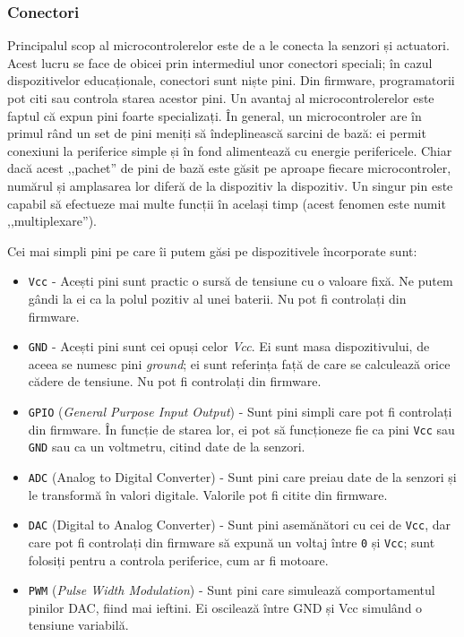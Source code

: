 \subsubsection{Conectori}
\label{sec:embed:micro-comp:micro:connect}

Principalul scop al microcontrolerelor este de a le conecta la senzori și
actuatori. Acest lucru se face de obicei prin intermediul unor conectori
speciali; în cazul dispozitivelor educaționale, conectori sunt niște pini. Din
firmware, programatorii pot citi sau controla starea acestor pini. Un avantaj al
microcontrolerelor este faptul că expun pini foarte specializați. În
general, un microcontroler are în primul rând un set de pini meniți să
îndeplinească sarcini de bază: ei permit conexiuni la periferice simple și în
fond alimentează cu energie perifericele. Chiar dacă acest ,,pachet'' de pini de
bază este găsit pe aproape fiecare microcontroler, numărul și amplasarea lor
diferă de la dispozitiv la dispozitiv. Un singur pin este capabil să efectueze
mai multe funcții în același timp (acest fenomen este numit ,,multiplexare'').

Cei mai simpli pini pe care îi putem găsi pe dispozitivele încorporate sunt:

\begin{itemize}
  \item \texttt{Vcc} - Acești pini sunt practic o sursă de tensiune cu o valoare
		fixă. Ne putem gândi la ei ca la polul pozitiv al unei baterii.
		Nu pot fi controlați din firmware.
              \item \texttt{GND} - Acești pini sunt cei opuși celor \textit{Vcc}. Ei sunt masa
                dispozitivului, de aceea se numesc pini \textit{ground}; ei sunt
		referința față de care se calculează orice cădere de tensiune.
		Nu pot fi controlați din firmware.
              \item \texttt{GPIO}  (\textit{General Purpose
                Input Output}) - Sunt pini simpli care pot fi controlați din
		firmware. În funcție de starea lor, ei pot să funcționeze fie ca
                pini \texttt{Vcc} sau \texttt{GND} sau ca un voltmetru, citind date de la senzori.
              \item \texttt{ADC}  (Analog to Digital
		Converter) - Sunt pini care preiau date de la senzori și le
		transformă în valori digitale. Valorile pot fi citite din
		firmware.
              \item \texttt{DAC}  (Digital to Analog
                Converter) - Sunt pini asemănători cu cei de \texttt{Vcc}, dar care pot
                fi controlați din firmware să expună un voltaj între \texttt{0} și \texttt{Vcc};
		sunt folosiți pentru a controla periferice, cum ar fi motoare.
              \item \texttt{PWM}  (\textit{Pulse Width Modulation})
		- Sunt pini care simulează comportamentul pinilor DAC, fiind mai
		ieftini. Ei oscilează între GND și Vcc simulând o tensiune
		variabilă.
\end{itemize}

